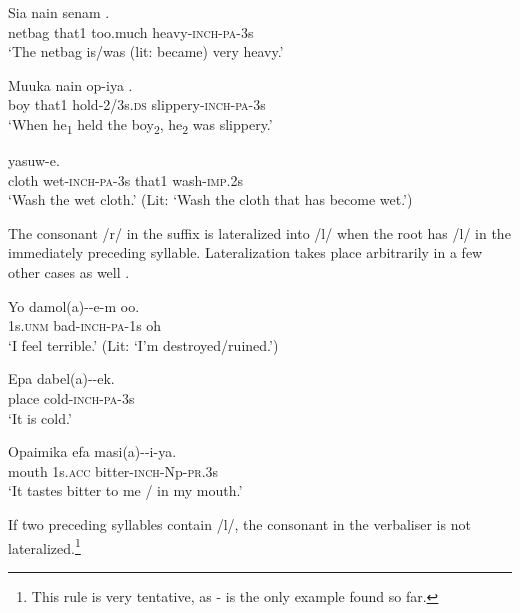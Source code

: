 \ea%
\label{ex:3:x82}
\gll Sia nain senam . \\
netbag that1 too.much heavy-\textsc{inch}-\textsc{pa}-3s\\
\glt`The netbag is/was (lit: became) very heavy.' 
\z

\ea%
\label{ex:3:x1764}
\gll Muuka nain op-iya \textstyleEmphasizedVernacularWords{-}\textstyleEmphasizedVernacularWords{-}. \\
boy that1 hold-2/3s.\textsc{ds} slippery-\textsc{inch}-\textsc{pa}-3s\\
\glt`When he\textsubscript{1} held the boy\textsubscript{2}, he\textsubscript{2} was slippery.'
\z

\ea%
\label{ex:3:x83}
 yasuw-e. \\
cloth wet-\textsc{inch}-\textsc{pa}-3s that1 wash-\textsc{imp}.2s\\
\glt`Wash the wet cloth.' (Lit: `Wash the cloth that has become wet.')
\z

The consonant /r/ in the suffix is lateralized into /l/ when the root has /l/ in the immediately preceding syllable. Lateralization takes place arbitrarily in a few other cases as well .

\ea%
\label{ex:3:x197}
\gll Yo damol(a)--e-m oo. \\
1s.\textsc{unm} bad-\textsc{inch}-\textsc{pa}-1s oh \\
\glt`I feel terrible.' (Lit: `I'm destroyed/ruined.') 
\z

\ea%
\label{ex:3:x198}
\gll Epa dabel(a)--ek. \\
place cold-\textsc{inch}-\textsc{pa}-3s \\
\glt`It is cold.'
\z

\ea%
\label{ex:3:x199}
\gll Opaimika efa masi(a)--i-ya. \\
mouth 1s.\textsc{acc} bitter-\textsc{inch}-Np-\textsc{pr}.3s \\
\glt`It tastes bitter to me / in my mouth.'
\z

If two preceding syllables contain /l/, the consonant in the verbaliser is not lateralized.\footnote{This rule is very tentative, as - is the only example found so far.}


